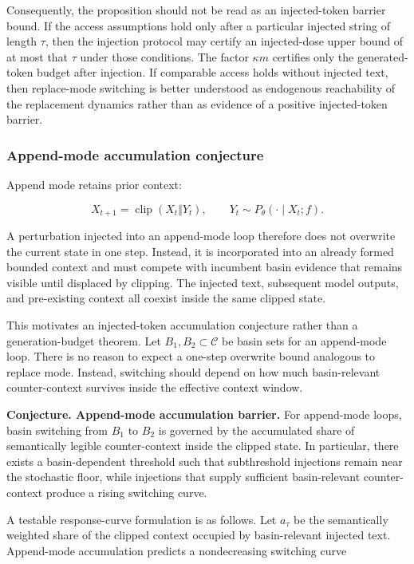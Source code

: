 \documentclass{article}
\theoremstyle{plain}
\theoremstyle{definition}
\begin{document}
Consequently, the proposition should not be read as an injected-token barrier bound. If the access assumptions hold only after a particular injected string of length \(\tau\), then the injection protocol may certify an injected-dose upper bound of at most that \(\tau\) under those conditions. The factor \(\kappa m\) certifies only the generated-token budget after injection. If comparable access holds without injected text, then replace-mode switching is better understood as endogenous reachability of the replacement dynamics rather than as evidence of a positive injected-token barrier.

\subsubsection{Append-mode accumulation conjecture}

Append mode retains prior context:

\[X_{t+1}
=
\operatorname{clip}(X_t \Vert Y_t),
\qquad
Y_t\sim P_\theta(\cdot\mid X_t;f).\]

A perturbation injected into an append-mode loop therefore does not overwrite the current state in one step. Instead, it is incorporated into an already formed bounded context and must compete with incumbent basin evidence that remains visible until displaced by clipping. The injected text, subsequent model outputs, and pre-existing context all coexist inside the same clipped state.

This motivates an injected-token accumulation conjecture rather than a generation-budget theorem. Let \(B_1,B_2\subset\mathcal{C}\) be basin sets for an append-mode loop. There is no reason to expect a one-step overwrite bound analogous to replace mode. Instead, switching should depend on how much basin-relevant counter-context survives inside the effective context window.

\textbf{Conjecture. Append-mode accumulation barrier.} For append-mode loops, basin switching from \(B_1\) to \(B_2\) is governed by the accumulated share of semantically legible counter-context inside the clipped state. In particular, there exists a basin-dependent threshold such that subthreshold injections remain near the stochastic floor, while injections that supply sufficient basin-relevant counter-context produce a rising switching curve.

A testable response-curve formulation is as follows. Let \(a_\tau\) be the semantically weighted share of the clipped context occupied by basin-relevant injected text. Append-mode accumulation predicts a nondecreasing switching curve
\end{document}
